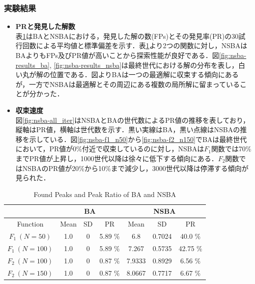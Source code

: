 \documentclass[a4j,11pt]{jarticle}
\begin{document}
\subsubsection{実験結果}
\label{sss:nsba-results}
\begin{itemize}
\item {\bf PRと発見した解数} \\
表\ref{tab:nsba}はBAとNSBAにおける，発見した解の数(FPs)とその発見率(PR)の30試行回数による平均値と標準偏差を示す．表\ref{tab:nsba}より2つの関数に対し，NSBAはBAよりもFPs及びPR値が高いことから探索性能が良好である．図\ref{fig:nsba-results_ba}, \ref{fig:nsba-results_nsba}は最終世代における解の分布を表し，白い丸が解の位置である．図よりBAは一つの最適解に収束する傾向にあるが，一方でNSBAは最適解とその周辺にある複数の局所解に留まっていることが分かった．
\item {\bf 収束速度} \\
図\ref{fig:nsba-all_iter}はNSBAとBAの世代数によるPR値の推移を表しており，縦軸はPR値，横軸は世代数を示す．黒い実線はBA，黒い点線はNSBAの推移を示している．図\ref{fig:nsba-f1_n50}から\ref{fig:nsba-f2_n150}でBAは最終世代において，PR値が0\%付近で収束しているのに対し，NSBAは$F_1$関数では70\%までPR値が上昇し，1000世代以降は徐々に低下する傾向にある．$F_2$関数ではNSBAのPR値が20\%から10\%まで減少し，3000世代以降は停滞する傾向が見られた．
\end{itemize}  

\begin{table}[h]
\caption{Found Peaks and Peak Ratio of BA and NSBA}
\begin{center}
\begin{tabular}{c|c|c|c|c|c|c}
\hline
\multicolumn{1}{c|}{} & \multicolumn{3}{c|}{BA} & \multicolumn{3}{c}{NSBA}  \\
\hline
Function & Mean & SD & PR & Mean & SD & PR \\
\hline
$F_1 \ (N=50)$ & 1.0 & 0 & 5.89 \% & 6.8 & 0.7024 & 40.0 \% \\
\hline
$F_1 \ (N=100)$ & 1.0 & 0 & 5.89 \% & 7.267 & 0.5735 & 42.75 \% \\
\hline
$F_2 \ (N=100)$ & 1.0 & 0 & 0.87 \% & 7.9333 & 0.8929 & 6.56 \% \\
\hline
$F_2 \ (N=150)$ & 1.0 & 0 & 0.87 \% & 8.0667 & 0.7717 & 6.67 \% \\
\hline
\end{tabular}
\label{tab:nsba}
\end{center}
\end{table}
\end{document}
